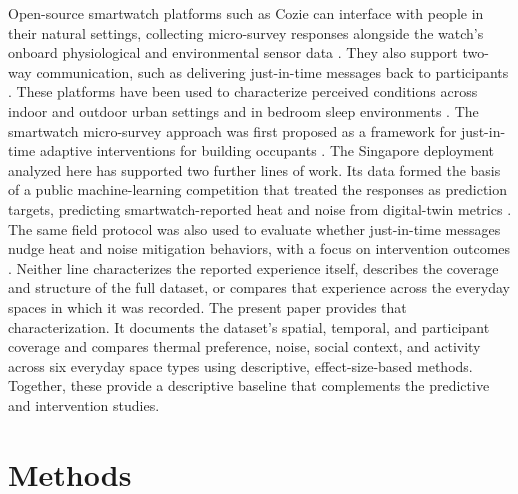 \documentclass[]{interact}
\begin{document}
Open-source smartwatch platforms such as Cozie can interface with people in their natural settings, collecting micro-survey responses alongside the watch's onboard physiological and environmental sensor data \citep{Tartarini2023-iu}.
They also support two-way communication, such as delivering just-in-time messages back to participants \citep{Miller2025-sv}.
These platforms have been used to characterize perceived conditions across indoor and outdoor urban settings \citep{Tartarini2023-iu} and in bedroom sleep environments \citep{Miller2025-ne}.
The smartwatch micro-survey approach was first proposed as a framework for just-in-time adaptive interventions for building occupants \citep{Miller2022-dy}.
The Singapore deployment analyzed here has supported two further lines of work.
Its data formed the basis of a public machine-learning competition that treated the responses as prediction targets, predicting smartwatch-reported heat and noise from digital-twin metrics \citep{Miller2023-wi,Miller2025-qu}.
The same field protocol was also used to evaluate whether just-in-time messages nudge heat and noise mitigation behaviors, with a focus on intervention outcomes \citep{Miller2025-sv}.
Neither line characterizes the reported experience itself, describes the coverage and structure of the full dataset, or compares that experience across the everyday spaces in which it was recorded.
The present paper provides that characterization.
It documents the dataset's spatial, temporal, and participant coverage and compares thermal preference, noise, social context, and activity across six everyday space types using descriptive, effect-size-based methods.
Together, these provide a descriptive baseline that complements the predictive and intervention studies.

\section{Methods}\label{sec:methods}
\end{document}
